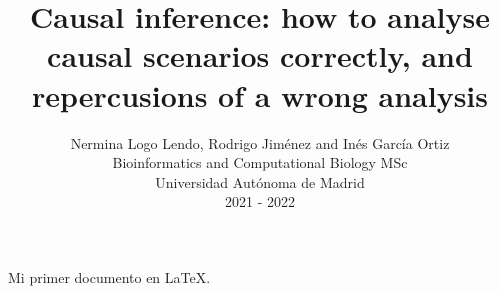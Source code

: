 \documentclass{article}
\title{Causal inference: how to analyse causal scenarios correctly, and repercusions of a wrong analysis}
\author{Nermina Logo Lendo, Rodrigo Jiménez and Inés García Ortiz\\
      Bioinformatics and Computational Biology MSc\\
      Universidad Autónoma de Madrid\\
      2021 - 2022}
\begin{document}

\maketitle

Mi primer documento en \LaTeX{}.
\end{document}
